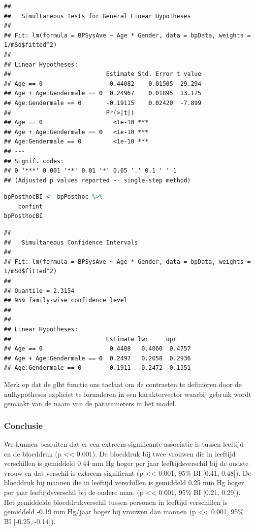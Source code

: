 \documentclass[
  12pt,dutch,coursenotes]{book}
\begin{document}
\begin{lstlisting}
## 
##   Simultaneous Tests for General Linear Hypotheses
## 
## Fit: lm(formula = BPSysAve ~ Age * Gender, data = bpData, weights = 1/mSd$fitted^2)
## 
## Linear Hypotheses:
##                           Estimate Std. Error t value
## Age == 0                   0.44082    0.01505  29.294
## Age + Age:Gendermale == 0  0.24967    0.01895  13.175
## Age:Gendermale == 0       -0.19115    0.02420  -7.899
##                           Pr(>|t|)    
## Age == 0                    <1e-10 ***
## Age + Age:Gendermale == 0   <1e-10 ***
## Age:Gendermale == 0         <1e-10 ***
## ---
## Signif. codes:  
## 0 '***' 0.001 '**' 0.01 '*' 0.05 '.' 0.1 ' ' 1
## (Adjusted p values reported -- single-step method)
\end{lstlisting}

\begin{lstlisting}[language=R]
bpPosthocBI <- bpPosthoc %>%
    confint
bpPosthocBI
\end{lstlisting}

\begin{lstlisting}
## 
##   Simultaneous Confidence Intervals
## 
## Fit: lm(formula = BPSysAve ~ Age * Gender, data = bpData, weights = 1/mSd$fitted^2)
## 
## Quantile = 2.3154
## 95% family-wise confidence level
##  
## 
## Linear Hypotheses:
##                           Estimate lwr     upr    
## Age == 0                   0.4408   0.4060  0.4757
## Age + Age:Gendermale == 0  0.2497   0.2058  0.2936
## Age:Gendermale == 0       -0.1911  -0.2472 -0.1351
\end{lstlisting}

Merk op dat de glht functie ons toelaat om de contrasten te definiëren door de nulhypotheses expliciet te formuleren in een karaktervector waarbij gebruik wordt gemaakt van de naam van de pararameters in het model.

\hypertarget{conclusie-2}{%
\subsubsection{Conclusie}\label{conclusie-2}}

We kunnen besluiten dat er een extreem significante associatie is tussen leeftijd en de bloeddruk (p \textless\textless{} 0.001).
De bloeddruk bij twee vrouwen die in leeftijd verschillen is gemiddeld 0.44 mm Hg hoger per jaar leeftijdsverschil bij de oudste vrouw en dat verschil is extreem significant (p \textless\textless{} 0.001, 95\% BI {[}0.41, 0.48{]}).
De bloeddruk bij mannen die in leeftijd verschillen is gemiddeld 0.25 mm Hg hoger per jaar leeftijdsverschil bij de oudere man. (p \textless\textless{} 0.001, 95\% BI {[}0.21, 0.29{]}).
Het gemiddelde bloeddrukverschil tussen personen in leeftijd verschillen is gemiddeld -0.19 mm Hg/jaar hoger bij vrouwen dan mannen (p \textless\textless{} 0.001, 95\% BI {[}-0.25, -0.14{]}).
\end{document}
